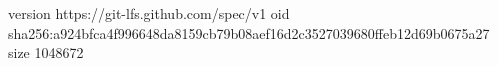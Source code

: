 version https://git-lfs.github.com/spec/v1
oid sha256:a924bfca4f996648da8159cb79b08aef16d2c3527039680ffeb12d69b0675a27
size 1048672
